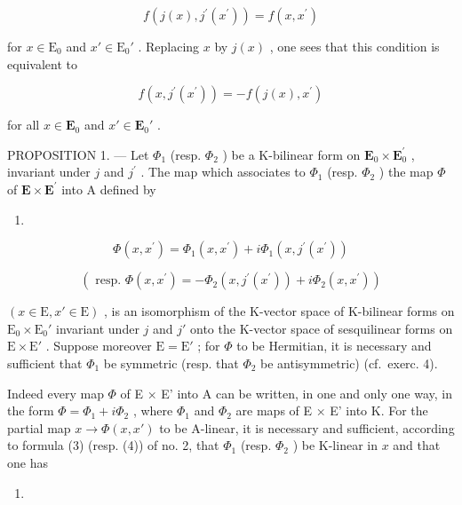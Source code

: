 \[
f (j (x), j ^ {\prime} (x ^ {\prime})) = f (x, x ^ {\prime})\tag{5}
\]

for \(x \in \mathrm{E}_0\) and \(x' \in \mathrm{E}_0'\) . Replacing \(x\) by \(j(x)\) , one sees that this condition is equivalent to

\[
f (x, j ^ {\prime} (x ^ {\prime})) = - f (j (x), x ^ {\prime})\tag{6}
\]

for all \(x \in \mathbf{E}_0\) and \(x' \in \mathbf{E}_0'\) .

PROPOSITION 1. --- Let \(\Phi_{1}\) (resp. \(\Phi_{2}\) ) be a K-bilinear form on \(\mathbf{E}_{0} \times \mathbf{E}_{0}^{\prime}\) , invariant under \(j\) and \(j^{\prime}\) . The map which associates to \(\Phi_{1}\) (resp. \(\Phi_{2}\) ) the map \(\Phi\) of \(\mathbf{E} \times \mathbf{E}^{\prime}\) into A defined by

\begin{enumerate}
\def\labelenumi{(\arabic{enumi})}
\setcounter{enumi}{6}
\tightlist
\item
\end{enumerate}

\[
\Phi (x, x ^ {\prime}) = \Phi_ {1} (x, x ^ {\prime}) + i \Phi_ {1} (x, j ^ {\prime} (x ^ {\prime}))\tag{8}
\]

\[
(\text { resp. } \Phi (x, x ^ {\prime}) = - \Phi_ {2} (x, j ^ {\prime} (x ^ {\prime})) + i \Phi_ {2} (x, x ^ {\prime}))
\]

\((x \in \mathrm{E}, x' \in \mathrm{E})\) , is an isomorphism of the K-vector space of K-bilinear forms on \(\mathrm{E}_0 \times \mathrm{E}_0'\) invariant under \(j\) and \(j'\) onto the K-vector space of sesquilinear forms on \(\mathrm{E} \times \mathrm{E}'\) . Suppose moreover \(\mathrm{E} = \mathrm{E}'\) ; for \(\Phi\) to be Hermitian, it is necessary and sufficient that \(\Phi_1\) be symmetric (resp. that \(\Phi_2\) be antisymmetric) (cf.~exerc. 4).

Indeed every map \(\Phi\) of E × E' into A can be written, in one and only one way, in the form \(\Phi = \Phi_1 + i\Phi_2\) , where \(\Phi_1\) and \(\Phi_2\) are maps of E × E' into K. For the partial map \(x \to \Phi(x, x')\) to be A-linear, it is necessary and sufficient, according to formula (3) (resp. (4)) of no. 2, that \(\Phi_1\) (resp. \(\Phi_2\) ) be K-linear in \(x\) and that one has

\begin{enumerate}
\def\labelenumi{(\arabic{enumi})}
\setcounter{enumi}{8}
\tightlist
\item
\end{enumerate}


